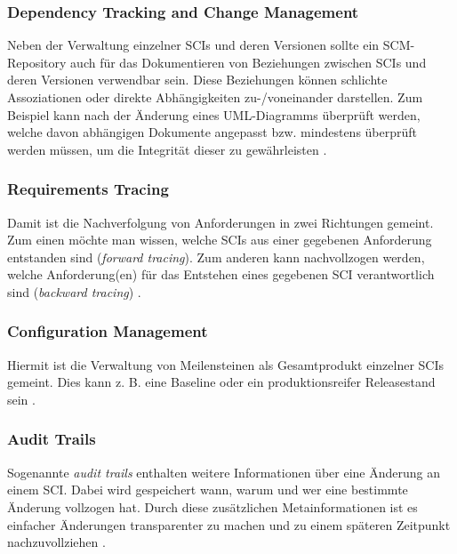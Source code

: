 \documentclass[runningheads,a4paper]{uwsese}
\begin{document}
\subsubsection{Dependency Tracking and Change Management}
Neben der Verwaltung einzelner SCIs und deren Versionen sollte ein SCM-Repository
auch für das Dokumentieren von Beziehungen zwischen SCIs und deren Versionen
verwendbar sein. Diese Beziehungen können schlichte Assoziationen oder direkte
Abhängigkeiten zu-/voneinander darstellen. Zum Beispiel kann nach der Änderung
eines UML-Diagramms überprüft werden, welche davon abhängigen Dokumente
angepasst bzw. mindestens überprüft werden müssen, um die Integrität dieser
zu gewährleisten
\cite[p. 592]{Pressman:2009:SEP:1593949}.

\subsubsection{Requirements Tracing}
Damit ist die Nachverfolgung von Anforderungen in zwei Richtungen gemeint.
Zum einen möchte man wissen, welche SCIs aus einer gegebenen Anforderung
entstanden sind ({\em forward tracing}). Zum anderen kann nachvollzogen werden,
welche Anforderung(en) für das Entstehen eines gegebenen SCI verantwortlich sind
({\em backward tracing})
\cite[p. 592]{Pressman:2009:SEP:1593949}.

\subsubsection{Configuration Management}
Hiermit ist die Verwaltung von Meilensteinen als Gesamtprodukt einzelner SCIs
gemeint. Dies kann z. B. eine Baseline oder ein produktionsreifer Releasestand sein
\cite[p. 592]{Pressman:2009:SEP:1593949}.

\subsubsection{Audit Trails}
Sogenannte {\em audit trails} enthalten weitere Informationen über eine Änderung
an einem SCI. Dabei wird gespeichert wann, warum und wer eine bestimmte Änderung
vollzogen hat. Durch diese zusätzlichen Metainformationen ist es einfacher
Änderungen transparenter zu machen und zu einem späteren Zeitpunkt nachzuvollziehen
\cite[p. 592]{Pressman:2009:SEP:1593949}.

\end{document}
